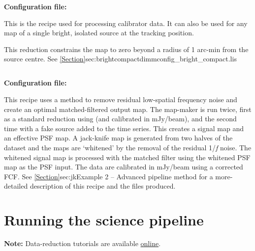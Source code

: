 \textbf{Configuration file: }

This is the recipe used for processing calibrator data. It can also
be used for any map of a single bright, isolated source at the
tracking position.

This reduction constrains the map to zero beyond a radius of 1 arc-min
from the source centre. See \cref{Section}{sec:brightcompact}{dimmconfig\_bright\_compact.lis}


\subsection{}

\textbf{Configuration file: }

This recipe uses a
method to remove residual low-spatial frequency noise and create an
optimal matched-filtered output map. The map-maker is run twice, first
as a standard reduction using  (and
calibrated in mJy/beam), and the second time with a fake source added
to the time series. This creates a signal map and an effective PSF
map. A jack-knife map is generated from two halves of the dataset and
the maps are `whitened' by the removal of the residual 1/\emph{f}
noise. The whitened signal map is processed with the matched filter
using the whitened PSF map as the PSF input. The data are calibrated
in mJy/beam using a corrected FCF.  See \cref{Section}{sec:jk}{Example
  2 -- Advanced pipeline method} for a more-detailed description of
this recipe and the files produced.


\section{Running the science pipeline}
\label{sec:plsteps}

\textbf{Note:} Data-reduction tutorials are available
\href{https://www.eaobservatory.org/jcmt/science/reductionanalysis-tutorials/}{online}.

